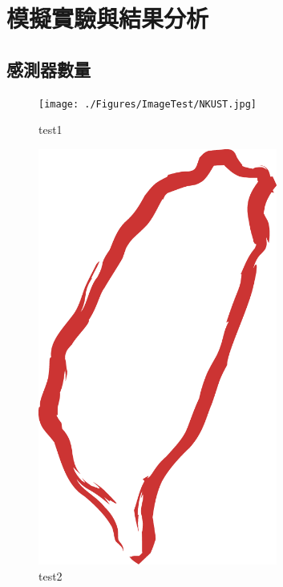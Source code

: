 \chapter{模擬實驗與結果分析}\label{Experimental_results}


\section{感測器數量}


\begin{figure}[H] 
    \centering 
    \texttt{[image: ./Figures/ImageTest/NKUST.jpg]} 
    \caption{test1} 
    \label{fig_good}
\end{figure}

\begin{figure}[H] 
    \centering 
    \includegraphics[width=0.7\textwidth]{./Figures/ImageTest/Taiwan_symbol.png} 
    \caption{test2} 
\end{figure}

